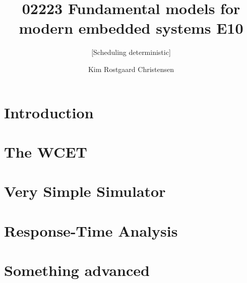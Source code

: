 \documentclass{acm_proc_article-sp}
\begin{document}
\title{02223 Fundamental models for modern embedded systems E10}
\subtitle{[Scheduling deterministic]
}

\author{
\alignauthor 
Kim Rostgaard Christensen\\
}

\maketitle

\begin{abstract}
\end{abstract}




\section{Introduction}



\section{The WCET}



\section{Very Simple Simulator}



\section{Response-Time Analysis}



\section{Something advanced}
%
\end{document}
